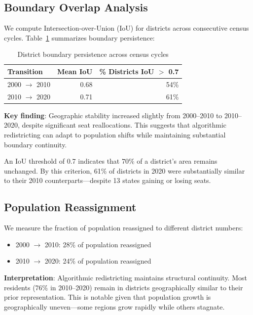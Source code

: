 \label{sec:stability}

\subsection{Boundary Overlap Analysis}

We compute Intersection-over-Union (IoU) for districts across consecutive census cycles. Table~\ref{tab:stability} summarizes boundary persistence:

\begin{table}[h]
\centering
\begin{tabular}{lrr}
\toprule
\textbf{Transition} & \textbf{Mean IoU} & \textbf{\% Districts IoU $>$ 0.7} \\
\midrule
2000 $\rightarrow$ 2010 & 0.68 & 54\% \\
2010 $\rightarrow$ 2020 & 0.71 & 61\% \\
\bottomrule
\end{tabular}
\caption{District boundary persistence across census cycles}
\label{tab:stability}
\end{table}

\textbf{Key finding}: Geographic stability increased slightly from 2000--2010 to 2010--2020, despite significant seat reallocations. This suggests that algorithmic redistricting can adapt to population shifts while maintaining substantial boundary continuity.

An IoU threshold of 0.7 indicates that 70\% of a district's area remains unchanged. By this criterion, 61\% of districts in 2020 were substantially similar to their 2010 counterparts—despite 13 states gaining or losing seats.

\subsection{Population Reassignment}

We measure the fraction of population reassigned to different district numbers:

\begin{itemize}
    \item 2000 $\rightarrow$ 2010: 28\% of population reassigned
    \item 2010 $\rightarrow$ 2020: 24\% of population reassigned
\end{itemize}

\textbf{Interpretation}: Algorithmic redistricting maintains structural continuity. Most residents (76\% in 2010--2020) remain in districts geographically similar to their prior representation. This is notable given that population growth is geographically uneven—some regions grow rapidly while others stagnate.

